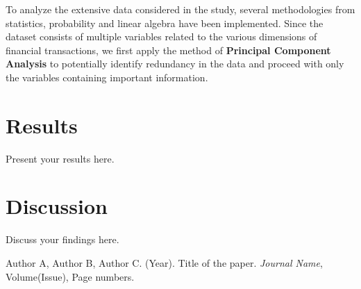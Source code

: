 \documentclass{article}
\begin{document}
To analyze the extensive data considered in the study, several methodologies from statistics, probability and linear algebra have been implemented. Since the dataset consists of multiple variables related to the various dimensions of financial transactions, we first apply the method of \textbf{Principal Component Analysis} to potentially identify redundancy in the data and proceed with only the variables containing important information.


\section{Results}
Present your results here.

\section{Discussion}
Discuss your findings here.

\begin{thebibliography}{9}
Author A, Author B, Author C. (Year). Title of the paper. \textit{Journal Name}, Volume(Issue), Page numbers.
\end{thebibliography}
\end{document}
